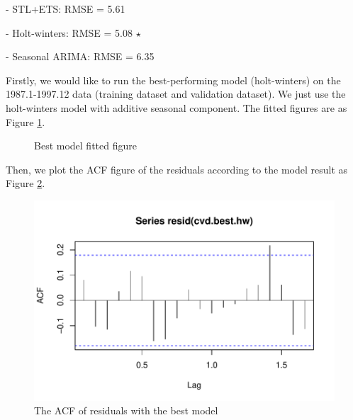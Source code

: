 \documentclass{article}
\begin{document}
\quad - STL+ETS:  RMSE = 5.61

\quad - Holt-winters:  RMSE = 5.08 $\star$

\quad - Seasonal ARIMA:  RMSE = 6.35 

Firstly, we would like to run the best-performing model (holt-winters) on the 1987.1-1997.12 data (training dataset and validation dataset). 
We just use the holt-winters model 
with additive seasonal component. The fitted figures are as Figure \ref{best-fit}.
\begin{figure}[H]
    \centering
    \quad
    \caption{Best model fitted figure}
    \label{best-fit}
\end{figure}
Then, we plot the ACF figure of the residuals according to the model result as Figure \ref{best-acf}. 
\begin{figure}[H]
    \centering
    \includegraphics[width=0.65\linewidth]{images/best-acf}
    \caption{The ACF of residuals with the best model}
    \label{best-acf}
\end{figure}
\end{document}
